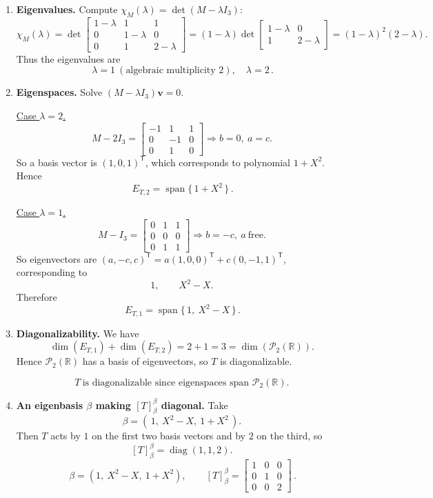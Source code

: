 \documentclass[12pt]{article}
\newcommand{\R}{\mathbb{R}}
\newcommand{\cP}{\mathcal{P}}
\DeclareMathOperator{\Span}{span}
\DeclareMathOperator{\diag}{diag}
\begin{document}
\begin{enumerate}[label=(\alph*)]
\item \textbf{Eigenvalues.}
Compute $\chi_M(\lambda)=\det(M-\lambda I_3)$:
\[
\chi_M(\lambda)=
\det\begin{bmatrix}
1-\lambda&1&1\\
0&1-\lambda&0\\
0&1&2-\lambda
\end{bmatrix}
=(1-\lambda)\det\begin{bmatrix}1-\lambda&0\\1&2-\lambda\end{bmatrix}
=(1-\lambda)^2(2-\lambda).
\]
Thus the eigenvalues are
\[
\boxed{\,\lambda=1\ (\text{algebraic multiplicity }2),\quad \lambda=2\, }.
\]

\item \textbf{Eigenspaces.}
Solve $(M-\lambda I_3)\bm{v}=0$.

\medskip
\noindent\underline{Case $\lambda=2$.}
\[
M-2I_3=
\begin{bmatrix}
-1&1&1\\
0&-1&0\\
0&1&0
\end{bmatrix}
\Rightarrow
b=0,\ a=c.
\]
So a basis vector is $(1,0,1)^{\mathsf T}$, which corresponds to polynomial $1+X^2$.
Hence
\[
\boxed{\,E_{T,2}=\Span\{\,1+X^2\,\}\, }.
\]

\medskip
\noindent\underline{Case $\lambda=1$.}
\[
M-I_3=
\begin{bmatrix}
0&1&1\\
0&0&0\\
0&1&1
\end{bmatrix}
\Rightarrow b=-c,\ a\ \text{free}.
\]
So eigenvectors are $(a,-c,c)^{\mathsf T}=a(1,0,0)^{\mathsf T}+c(0,-1,1)^{\mathsf T}$, corresponding to
\[
1,\qquad X^2-X.
\]
Therefore
\[
\boxed{\,E_{T,1}=\Span\{\,1,\ X^2-X\,\}\, }.
\]

\item \textbf{Diagonalizability.}
We have
\[
\dim(E_{T,1})+\dim(E_{T,2})=2+1=3=\dim(\cP_2(\R)).
\]
Hence $\cP_2(\R)$ has a basis of eigenvectors, so $T$ is diagonalizable.

\[
\boxed{\,T\ \text{is diagonalizable since eigenspaces span }\cP_2(\R).\,}
\]

\item \textbf{An eigenbasis $\beta$ making $[T]_{\beta}^{\beta}$ diagonal.}
Take
\[
\beta=(\,1,\ X^2-X,\ 1+X^2\,).
\]
Then $T$ acts by $1$ on the first two basis vectors and by $2$ on the third, so
\[
[T]_{\beta}^{\beta}=\diag(1,1,2).
\]
\[
\boxed{\,\beta=(1,\ X^2-X,\ 1+X^2),\qquad [T]_{\beta}^{\beta}=
\begin{bmatrix}1&0&0\\0&1&0\\0&0&2\end{bmatrix}\, }.
\]


\end{enumerate}
\end{document}
